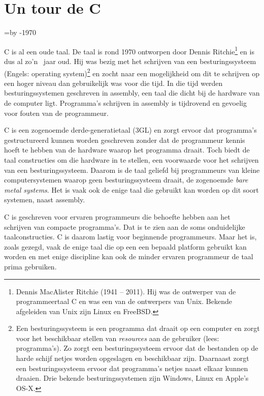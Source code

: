 \chapter{Un tour de C}
\label{cha:tour}
\thispagestyle{empty}

\newcount\cdifference\cdifference=\the\year\advance\cdifference by -1970

C is al een oude taal. De taal is rond 1970 ontworpen door Dennis Ritchie\footnote{Dennis MacAlister Ritchie (1941 -- 2011). Hij was de ontwerper van de programmeertaal C en was een van de ontwerpers van Unix. Bekende afgeleiden van Unix zijn Linux en FreeBSD.} en is dus al zo'n \the\cdifference\ jaar oud. Hij was bezig met het schrijven van een besturingssysteem (Engels: operating system)\footnote{Een besturingssysteem is een programma dat draait op een computer en zorgt voor het beschikbaar stellen van \textsl{resources} aan de gebruiker (lees: programma's). Zo zorgt een besturingssysteem ervoor dat de bestanden op de harde schijf netjes worden opgeslagen en beschikbaar zijn. Daarnaast zorgt een besturingssysteem ervoor dat programma's netjes naast elkaar kunnen draaien. Drie bekende besturingssystemen zijn Windows, Linux en Apple's OS-X.} en zocht naar een mogelijkheid om dit te schrijven op een hoger niveau dan gebruikelijk was voor die tijd. In die tijd werden besturingssystemen geschreven in assembly, een taal die dicht bij de hardware van de computer ligt. Programma's schrijven in assembly is tijdrovend en gevoelig voor fouten van de programmeur.

C is een zogenoemde derde-generatietaal (3GL) en zorgt ervoor dat programma's gestructureerd kunnen worden geschreven zonder dat de programmeur kennis hoeft te hebben van de hardware waarop het programma draait. Toch biedt de taal constructies om die hardware in te stellen, een voorwaarde voor het schrijven van een besturingssysteem. Daarom is de taal geliefd bij programmeurs van kleine computersystemen waarop geen besturingssysteem draait, de zogenoemde \textsl{bare metal systems}. Het is vaak ook de enige taal die gebruikt kan worden op dit soort systemen, naast assembly.

C is geschreven voor ervaren programmeurs die behoefte hebben aan het schrijven van compacte programma’s. Dat is te zien aan de soms onduidelijke taalconstructies. C is daarom lastig voor beginnende programmeurs. Maar het is, zoals gezegd, vaak de enige taal die op een een bepaald platform gebruikt kan worden en met enige discipline kan ook de minder ervaren programmeur de taal prima gebruiken.

